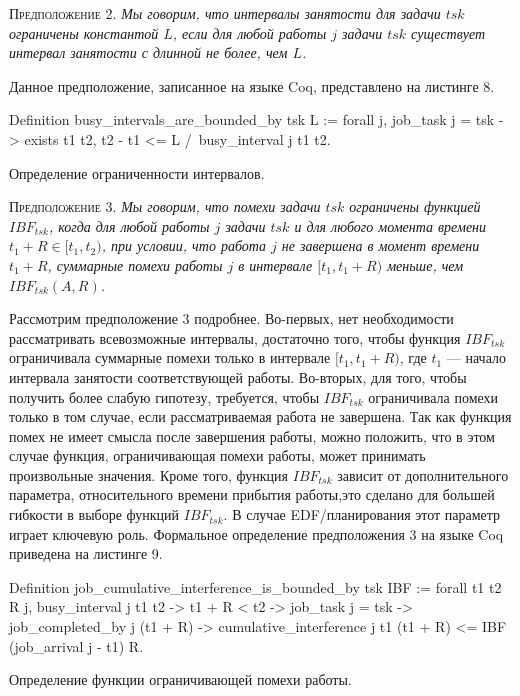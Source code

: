 \textsc{Предположение 2.}
\textit{Мы говорим, что интервалы занятости для задачи $tsk$ ограничены константой $L$,
  если для любой работы $j$ задачи $tsk$ существует интервал занятости с длинной не более, чем $L$. }

Данное предположение, записанное на языке Coq, представлено на листинге 8.


\begin{listing}
\begin{pyglist}[numbers=none,numbersep=5pt, fontsize=\small]
  Definition busy_intervals_are_bounded_by tsk L :=
    forall j,
      job_task j = tsk ->
      exists t1 t2,
        t2 - t1 <= L /\
        busy_interval j t1 t2.
\end{pyglist}
\caption{Определение ограниченности интервалов. }
\label{lst:theorem2}
\end{listing}

\textsc{Предположение 3.}
\textit{Мы говорим, что помехи задачи $tsk$ ограничены функцией $IBF_{tsk}$,
  когда для любой работы $j$ задачи $tsk$ и для любого момента времени $t_1 + R \in [t_1, t_2)$,
  при условии, что работа $j$ не завершена в момент времени $t_1 + R$,
  суммарные помехи работы $j$ в интервале $[t_1, t_1 + R)$ меньше, чем $IBF_{tsk}(A, R)$. }

 Рассмотрим предположение 3 подробнее. Во-первых,
  нет необходимости рассматривать всевозможные интервалы,
  достаточно того, чтобы функция $IBF_{tsk}$ ограничивала суммарные помехи только в интервале
  $[t_1, t_1 + R)$, где $t_1$ --- начало интервала занятости соответствующей работы.
  Во-вторых, для того, чтобы получить более слабую гипотезу, требуется, чтобы $IBF_{tsk}$
  ограничивала помехи только в том случае, если рассматриваемая работа не завершена.
  Так как функция помех не имеет смысла после завершения работы, можно положить,
  что в этом случае функция, ограничивающая помехи работы, может принимать произвольные значения.
  Кроме того, функция $IBF_{tsk}$ зависит от дополнительного параметра,
  относительного времени прибытия работы,это сделано для большей гибкости в выборе функций $IBF_{tsk}$.
  В случае EDF\-/планирования этот параметр играет ключевую роль. Формальное
  определение предположения 3 на языке Coq приведена на листинге 9.

\begin{listing}
\begin{pyglist}[numbers=none,numbersep=5pt, fontsize=\small]
  Definition job_cumulative_interference_is_bounded_by tsk
                                                       IBF :=
    forall t1 t2 R j,
      busy_interval j t1 t2 ->
      t1 + R < t2 ->
      job_task j = tsk ->
      ~~ job_completed_by j (t1 + R) ->
      cumulative_interference j t1 (t1 + R)
          <= IBF (job_arrival j - t1) R.
\end{pyglist}
\caption{Определение функции ограничивающей помехи работы. }
\label{lst:theorem2}
\end{listing}

